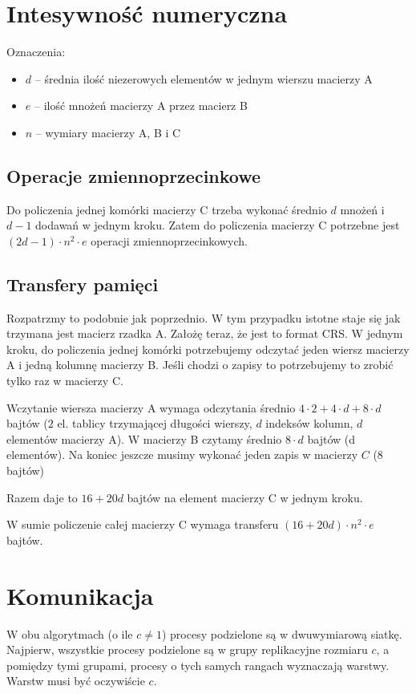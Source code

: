 \documentclass{article}
\begin{document}
\section{Intesywność numeryczna}
Oznaczenia:
\begin{itemize}
  \item $d$ -- średnia ilość niezerowych elementów w jednym wierszu macierzy A
  \item $e$ -- ilość mnożeń macierzy A przez macierz B
  \item $n$ -- wymiary macierzy A, B i C
\end{itemize}

\subsection{Operacje zmiennoprzecinkowe}
Do policzenia jednej komórki macierzy C trzeba wykonać średnio $d$ mnożeń i $d-1$ dodawań
w jednym kroku.
Zatem do policzenia macierzy C potrzebne jest $(2d-1) \cdot n^2 \cdot e$ operacji zmiennoprzecinkowych.

\subsection{Transfery pamięci}
Rozpatrzmy to podobnie jak poprzednio. W tym przypadku istotne staje się jak trzymana jest macierz rzadka A.
Założę teraz, że jest to format CRS.
W jednym kroku, do policzenia jednej komórki potrzebujemy odczytać jeden wiersz macierzy A i jedną kolumnę macierzy B.
Jeśli chodzi o zapisy to potrzebujemy to zrobić tylko raz w macierzy C.

Wczytanie wiersza macierzy A wymaga odczytania średnio $4 \cdot 2 + 4 \cdot d + 8 \cdot d$ bajtów ($2$ el. tablicy trzymającej długości wierszy,
$d$ indeksów kolumn, $d$ elementów macierzy A). W macierzy B czytamy średnio $8 \cdot d$ bajtów (d elementów).
Na koniec jeszcze musimy wykonać jeden zapis w macierzy $C$ (8 bajtów)

Razem daje to $16 + 20d$ bajtów na element macierzy C w jednym kroku.

W sumie policzenie całej macierzy C wymaga transferu $(16 + 20d) \cdot n^2 \cdot e$ bajtów.


\section{Komunikacja}
W obu algorytmach (o ile $c \neq 1$) procesy podzielone są w dwuwymiarową siatkę. Najpierw, wszystkie procesy podzielone są w grupy
replikacyjne rozmiaru $c$, a pomiędzy tymi grupami, procesy o tych samych rangach wyznaczają warstwy. Warstw musi być oczywiście $c$.
\end{document}
